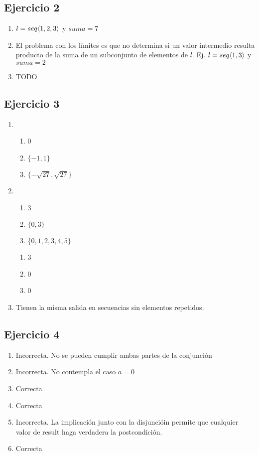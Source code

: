 \subsection{Ejercicio 2}
\begin{enumerate}[label=(\alph*)]
    \item $l = seq \langle 1,2,3\rangle$ y $suma = 7$
    \item El problema con los límites es que no determina si un valor intermedio resulta producto de la suma de
    un subconjunto de elementos de $l$. Ej. $l = seq \langle 1,3\rangle$ y $suma = 2$
    \item TODO
\end{enumerate}

\subsection{Ejercicio 3}
\begin{enumerate}[label=(\alph*)]
    \item \begin{enumerate}
        \item 0
        \item $\{-1,1\}$
        \item $\{-\sqrt{27},\sqrt{27}\}$
    \end{enumerate}
    \item \begin{enumerate}
        \item 3
        \item $\{0,3\}$
        \item $\{0,1,2,3,4,5\}$
    \end{enumerate}
    \begin{enumerate}
        \item 3
        \item 0
        \item 0
    \end{enumerate}
    \item Tienen la misma salida en secuencias sin elementos repetidos.
\end{enumerate}

\subsection{Ejercicio 4}
\begin{enumerate}[label=(\alph*)]
    \item Incorrecta. No se pueden cumplir ambas partes de la conjunción
    \item Incorrecta. No contempla el caso $a = 0$
    \item Correcta
    \item Correcta
    \item Incorrecta. La implicación junto con la disjuncióin permite que cualquier valor de result haga verdadera la
    postcondición.
    \item Correcta    
\end{enumerate}

